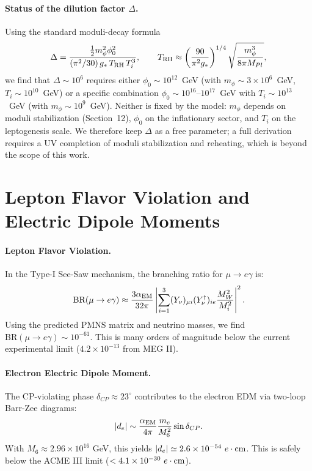 \documentclass[12pt,a4paper]{article}
\numberwithin{equation}{section}
\begin{document}
\paragraph{Status of the dilution factor \(\Delta\).}
Using the standard moduli-decay formula
\begin{equation}
\Delta = \frac{\tfrac12 m_\phi^2 \phi_0^2}
{(\pi^2/30)\,g_*\,T_{\rm RH}\,T_i^3},
\qquad
T_{\rm RH} \approx \left(\frac{90}{\pi^2 g_*}\right)^{1/4}
\sqrt{\frac{m_\phi^3}{8\pi M_{Pl}}},
\end{equation}
we find that \(\Delta \sim 10^6\) requires either \(\phi_0 \sim 10^{12}\)~GeV (with \(m_\phi \sim 3\times 10^6\)~GeV, \(T_i \sim 10^{10}\)~GeV) or a specific combination \(\phi_0 \sim 10^{16}\)--\(10^{17}\)~GeV with \(T_i \sim 10^{13}\)~GeV (with \(m_\phi \sim 10^9\)~GeV). Neither is fixed by the model: \(m_\phi\) depends on moduli stabilization (Section~12), \(\phi_0\) on the inflationary sector, and \(T_i\) on the leptogenesis scale. We therefore keep \(\Delta\) as a free parameter; a full derivation requires a UV completion of moduli stabilization and reheating, which is beyond the scope of this work.

\section{Lepton Flavor Violation and Electric Dipole Moments}
\label{sec:lfv_edm}
\paragraph{Lepton Flavor Violation.}
In the Type-I See-Saw mechanism, the branching ratio for \(\mu \to e \gamma\) is:
\begin{equation}
\text{BR}(\mu \to e \gamma) \approx \frac{3\alpha_{\rm EM}}{32\pi} \left| \sum_{i=1}^3 (Y_\nu)_{\mu i} (Y_\nu^\dagger)_{i e} \frac{M_W^2}{M_i^2} \right|^2.
\end{equation}
Using the predicted PMNS matrix and neutrino masses, we find \(\text{BR}(\mu \to e \gamma) \sim 10^{-61}\). This is many orders of magnitude below the current experimental limit (\(4.2 \times 10^{-13}\) from MEG II).

\paragraph{Electron Electric Dipole Moment.}
The CP-violating phase \(\delta_{CP} \approx 23^\circ\) contributes to the electron EDM via two-loop Barr-Zee diagrams:
\begin{equation}
|d_e| \sim \frac{\alpha_{\rm EM}}{4\pi} \frac{m_e}{M_6^2} \sin\delta_{CP}.
\end{equation}
With \(M_6 \approx 2.96 \times 10^{16}\) GeV, this yields \(|d_e| \simeq 2.6 \times 10^{-54}~e\cdot{\rm cm}\). This is safely below the ACME III limit (\(< 4.1 \times 10^{-30}~e\cdot{\rm cm}\)).
\end{document}
